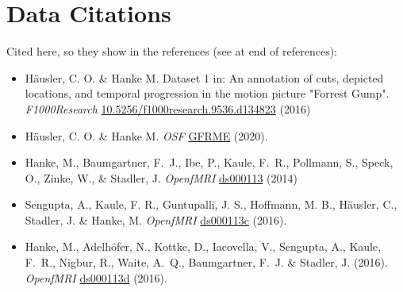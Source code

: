 \documentclass[english,11pt]{article}
\begin{document}
\section*{Data Citations}


Cited here, so they show in the references (see at end of references):
\citep{haeusler2016cutdata, haeusler2021speechdata, hanke2014ds000113, sengupta2016ds000113c, hanke2016ds000113d}

\begin{itemize}
\item Häusler, C. O. \& Hanke M. Dataset 1 in: An annotation of cuts, depicted
locations, and temporal progression in the motion picture "Forrest Gump".
\emph{F1000Research}
\href{https://doi.org/10.5256/f1000research.9536.d134823}{10.5256/f1000research.9536.d134823}
(2016)

\item Häusler, C. O. \& Hanke M. \emph{OSF}
\href{https://doi.org/10.17605/OSF.IO/GFRME}{GFRME}
(2020).

\item Hanke, M., Baumgartner, F.~J., Ibe, P., Kaule, F.~R., Pollmann, S., Speck, O.,
  Zinke, W., \& Stadler, J. \emph{OpenfMRI} \href{https://legacy.openfmri.org/dataset/ds000113}{ds000113} (2014)

\item Sengupta, A., Kaule, F. R., Guntupalli, J. S., Hoffmann, M. B., Häusler, C., Stadler, J. \& Hanke, M.
  \emph{OpenfMRI} \href{https://legacy.openfmri.org/dataset/ds000113c}{ds000113c} (2016).

\item Hanke, M., Adelhöfer, N., Kottke, D., Iacovella, V., Sengupta, A., Kaule, F.~R., Nigbur, R., Waite, A.~Q.,
  Baumgartner, F.~J. \& Stadler, J. (2016).
  \emph{OpenfMRI} \href{https://legacy.openfmri.org/dataset/ds000113d}{ds000113d} (2016).
\end{itemize}


{\small
}
\end{document}
